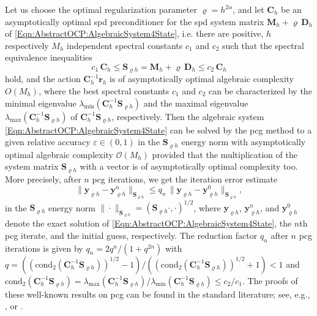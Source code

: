 \documentclass{article}
\numberwithin{equation}{section}
\begin{document}
Let us choose the optimal regularization parameter $\varrho = h^{2\alpha}$,
and let ${\mathbf C}_h$ be an asymptotically optimal spd preconditioner
for the spd system matrix ${\mathbf M}_h + \varrho \, {\mathbf D}_h$ of
\eqref{Eqn:AbstractOCP:AlgebraicSystem4State}, i.e. there are positive,
$h$ respectively $M_h$ independent spectral constants $c_1$ and $c_2$ such
that the  spectral equivalence inequalities
\begin{equation} \label{Eqn:AbstractOCP:SpectralEquivalenceInequalities}
  c_1 \, {\mathbf C}_h \le {\mathbf S}_{\varrho h} = {\mathbf M}_h +
  \varrho \, {\mathbf D}_h \le  c_2 \, {\mathbf C}_h
\end{equation}
hold, and the action ${\mathbf C}_h^{-1} {\mathbf r}_h$ is of asymptotically
optimal algebraic complexity $O(M_h)$, where the best spectral constants
$c_1$ and $c_2$ can be characterized by the minimal eigenvalue
$\lambda_{\min}({\mathbf C}_h^{-1}{\mathbf S}_{\varrho h})$ and the maximal
eigenvalue $\lambda_{\max}({\mathbf C}_h^{-1}{\mathbf S}_{\varrho h})$ 
of ${\mathbf C}_h^{-1}{\mathbf S}_{\varrho h}$, respectively. Then the
algebraic system \eqref{Eqn:AbstractOCP:AlgebraicSystem4State} 
can be solved by the pcg method 
to a given relative accuracy $\varepsilon \in (0,1)$ in the
${\mathbf S}_{\varrho h}$ energy norm with asymptotically optimal algebraic
complexity ${\mathcal{O}}(M_h)$ provided that the multiplication of the
system matrix ${\mathbf S}_{\varrho h}$ with a vector is of asymptotically
optimal complexity too. More precisely, after $n$ pcg iterations, we get
the iteration error estimate
\begin{equation} \label{Eqn:AbstractOCP:IterationErrorEstimate}
  \|{\mathbf y}_{\varrho h} - {\mathbf y}_{\varrho h}^n \|_{{\mathbf S}_{\varrho h}} 
  \le q_n \,
  \|{\mathbf y}_{\varrho h} - {\mathbf y}_{\varrho h}^0 \|_{{\mathbf S}_{\varrho h}}, 
\end{equation}
in the ${\mathbf S}_{\varrho h}$ energy norm 
$\|\cdot\|_{{\mathbf S}_{\varrho h}} = ({\mathbf S}_{\varrho h}\cdot,\cdot)^{1/2}$,
where ${\mathbf y}_{\varrho h}$, ${\mathbf y}_{\varrho h}^n$, and
${\mathbf y}_{\varrho h}^0$ denote the exact solution of
\eqref{Eqn:AbstractOCP:AlgebraicSystem4State}, the $n$th pcg iterate, and
the initial guess, respectively. The reduction factor $q_n$ after $n$ pcg
iterations is given by $q_n = 2 q^n/(1+q^{2n})$ with
$q = ((\text{cond}_2({\mathbf C}_h^{-1}{\mathbf S}_{\varrho h}))^{1/2}-1)/((\text{cond}_2({\mathbf C}_h^{-1}{\mathbf S}_{\varrho h}))^{1/2} + 1) < 1$
and $\text{cond}_2({\mathbf C}_h^{-1}{\mathbf S}_{\varrho h}) 
= \lambda_{\max}({\mathbf C}_h^{-1}{\mathbf S}_{\varrho h})/\lambda_{\min}({\mathbf C}_h^{-1}{\mathbf S}_{\varrho h})
\le c_2/c_1$. The proofs of these well-known results on pcg can be found 
in the standard literature; 
see, e.g., \cite[Chapter 10]{Hackbusch2016Book}, or \cite[Chapter 13]{Steinbach:2008Book}.
 
\end{document}

